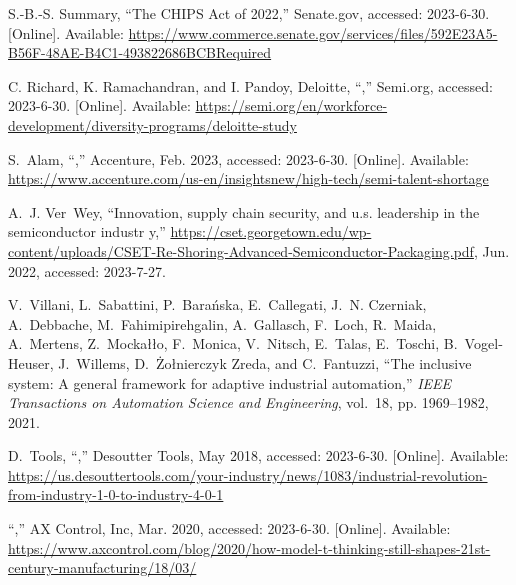 \documentclass[conference]{IEEEtran}
\begin{document}
\begin{thebibliography}{10}
\BIBentryALTinterwordspacing
S.-B.-S. Summary, ``The {CHIPS} {A}ct of 2022,'' Senate.gov, accessed:
  2023-6-30. [Online]. Available:
  \url{https://www.commerce.senate.gov/services/files/592E23A5-B56F-48AE-B4C1-493822686BCBRequired}
\BIBentrySTDinterwordspacing

\BIBentryALTinterwordspacing
{C. Richard, K. Ramachandran, and I. Pandoy, Deloitte},
  ``,'' Semi.org, accessed: 2023-6-30. [Online]. Available:
  \url{https://semi.org/en/workforce-development/diversity-programs/deloitte-study}
\BIBentrySTDinterwordspacing

\BIBentryALTinterwordspacing
S.~Alam, ``,'' Accenture,
  Feb. 2023, accessed: 2023-6-30. [Online]. Available:
  \url{https://www.accenture.com/us-en/insightsnew/high-tech/semi-talent-shortage}
\BIBentrySTDinterwordspacing

A.~J. Ver~Wey, ``Innovation, supply chain security, and u.s. leadership in the
  semiconductor industr y,''
  \url{https://cset.georgetown.edu/wp-content/uploads/CSET-Re-Shoring-Advanced-Semiconductor-Packaging.pdf},
  Jun. 2022, accessed: 2023-7-27.

V.~Villani, L.~Sabattini, P.~Barańska, E.~Callegati, J.~N. Czerniak,
  A.~Debbache, M.~Fahimipirehgalin, A.~Gallasch, F.~Loch, R.~Maida, A.~Mertens,
  Z.~Mockałło, F.~Monica, V.~Nitsch, E.~Talas, E.~Toschi, B.~Vogel‐Heuser,
  J.~Willems, D.~Żołnierczyk Zreda, and C.~Fantuzzi, ``The inclusive system:
  A general framework for adaptive industrial automation,'' \emph{IEEE
  Transactions on Automation Science and Engineering}, vol.~18, pp. 1969--1982,
  2021.

\BIBentryALTinterwordspacing
D.~Tools, ``,'' Desoutter Tools, May 2018, accessed: 2023-6-30.
  [Online]. Available:
  \url{https://us.desouttertools.com/your-industry/news/1083/industrial-revolution-from-industry-1-0-to-industry-4-0-1}
\BIBentrySTDinterwordspacing

\BIBentryALTinterwordspacing
``,'' {AX} Control, Inc, Mar. 2020, accessed: 2023-6-30.
  [Online]. Available:
  \url{https://www.axcontrol.com/blog/2020/how-model-t-thinking-still-shapes-21st-century-manufacturing/18/03/}
\BIBentrySTDinterwordspacing


\end{thebibliography}
\end{document}
